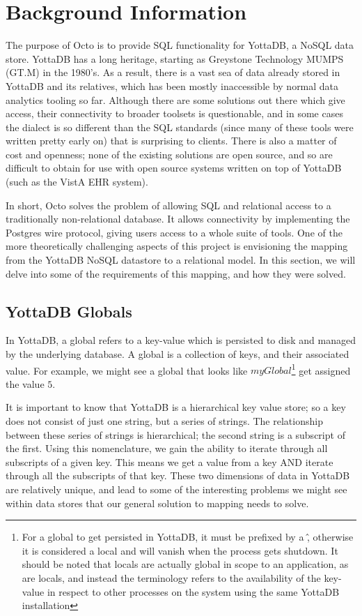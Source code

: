 \documentclass[]{article}
\begin{document}
\section{Background Information}

The purpose of Octo is to provide SQL functionality for YottaDB, a NoSQL data store.
YottaDB has a long heritage, starting as Greystone Technology MUMPS (GT.M) in the 1980's.
As a result, there is a vast sea of data already stored in YottaDB and its relatives, which has been mostly inaccessible by normal data analytics tooling so far.
Although there are some solutions out there which give access, their connectivity to broader toolsets is questionable, and in some cases the dialect is so different than the SQL standards (since many of these tools were written pretty early on) that is surprising to clients.
There is also a matter of cost and openness; none of the existing solutions are open source, and so are difficult to obtain for use with open source systems written on top of YottaDB (such as the VistA EHR system).

In short, Octo solves the problem of allowing SQL and relational access to a traditionally non-relational database.
It allows connectivity by implementing the Postgres wire protocol, giving users access to a whole suite of tools.
One of the more theoretically challenging aspects of this project is envisioning the mapping from the YottaDB NoSQL datastore to a relational model.
In this section, we will delve into some of the requirements of this mapping, and how they were solved.

\subsection{YottaDB Globals}

In YottaDB, a global refers to a key-value which is persisted to disk and managed by the underlying database.
A global is a collection of keys, and their associated value.
For example, we might see a global that looks like $myGlobal$\footnote{For a global to get persisted in YottaDB, it must be prefixed by a \^, otherwise it is considered a local and will vanish when the process gets shutdown. It should be noted that locals are actually global in scope to an application, as are locals, and instead the terminology refers to the availability of the key-value in respect to other processes on the system using the same YottaDB installation} get assigned the value $5$.

It is important to know that YottaDB is a hierarchical key value store; so a key does not consist of just one string, but a series of strings.
The relationship between these series of strings is hierarchical; the second string is a subscript of the first.
Using this nomenclature, we gain the ability to iterate through all subscripts of a given key.
This means we get a value from a key AND iterate through all the subscripts of that key.
These two dimensions of data in YottaDB are relatively unique, and lead to some of the interesting problems we might see within data stores that our general solution to mapping needs to solve.
\end{document}
